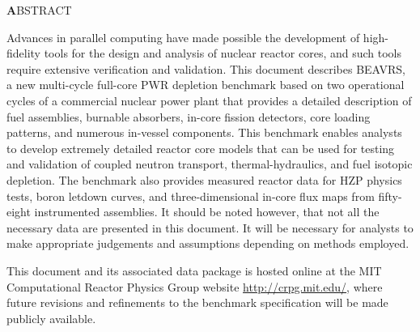 \begin{center}
  \large\textbf ABSTRACT
\end{center}

Advances in parallel computing have made possible the development of
high-fidelity tools for the design and analysis of nuclear reactor cores, and
such tools require extensive verification and validation. This document
describes BEAVRS, a new multi-cycle full-core \ac{PWR} depletion benchmark based
on two operational cycles of a commercial nuclear power plant that provides a
detailed description of fuel assemblies, burnable absorbers, in-core fission
detectors, core loading patterns, and numerous in-vessel components. This
benchmark enables analysts to develop extremely detailed reactor core models
that can be used for testing and validation of coupled neutron transport,
thermal-hydraulics, and fuel isotopic depletion. The benchmark also provides
measured reactor data for \ac{HZP} physics tests, boron letdown curves, and
three-dimensional in-core flux maps from fifty-eight instrumented assemblies.
It should be noted however, that not all the necessary data are presented
in this document. It will be necessary for analysts to make appropriate
judgements and assumptions depending on methods employed.

This document and its associated data package is hosted
online at the MIT Computational Reactor Physics Group website
\url{http://crpg.mit.edu/}, where future revisions and refinements to the benchmark
specification will be made publicly available.

\acresetall
